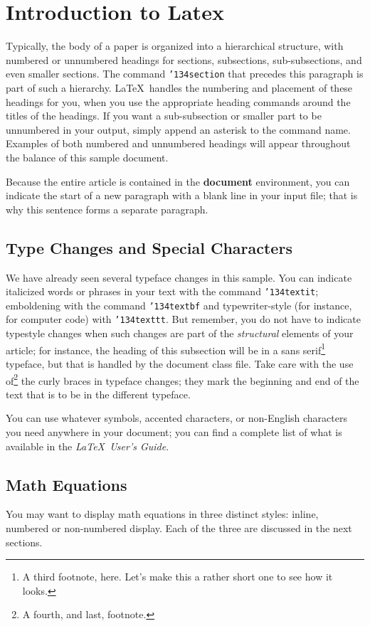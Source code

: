 \documentclass{sig-alternate-br}
\begin{document}
\section{Introduction to Latex}
Typically, the body of a paper is organized into a hierarchical
structure, with numbered or unnumbered headings for sections,
subsections, sub-subsections, and even smaller sections.  The
command \texttt{{\char'134}section} that precedes this paragraph
is part of such a hierarchy. \LaTeX\ handles the numbering and placement of these
headings for you, when you use the appropriate heading commands
around the titles of the headings.  If you want a sub-subsection
or smaller part to be unnumbered in your output, simply append an
asterisk to the command name.  Examples of both numbered and
unnumbered headings will appear throughout the balance of this
sample document.

Because the entire article is contained in the \textbf{document}
environment, you can indicate the start of a new paragraph with a
blank line in your input file; that is why this sentence forms a
separate paragraph.

\subsection{Type Changes and {\subsecit Special} Characters}
We have already seen several typeface changes in this sample.  You
can indicate italicized words or phrases in your text with the
command \texttt{{\char'134}textit}; emboldening with the command
\texttt{{\char'134}textbf} and typewriter-style (for instance, for
computer code) with \texttt{{\char'134}texttt}.  But remember, you
do not have to indicate typestyle changes when such changes are
part of the \textit{structural} elements of your article; for
instance, the heading of this subsection will be in a sans
serif\footnote{A third footnote, here. Let's make this a rather
short one to see how it looks.} typeface, but that is handled by
the document class file. Take care with the use of\footnote{A
fourth, and last, footnote.} the curly braces in typeface changes;
they mark the beginning and end of the text that is to be in the
different typeface.

You can use whatever symbols, accented characters, or non-English
characters you need anywhere in your document; you can find a
complete list of what is available in the \textit{\LaTeX\ User's
Guide}\cite{Lamport:LaTeX}.

\subsection{Math Equations}
You may want to display math equations in three distinct styles:
inline, numbered or non-numbered display.  Each of the three are
discussed in the next sections.
\end{document}
